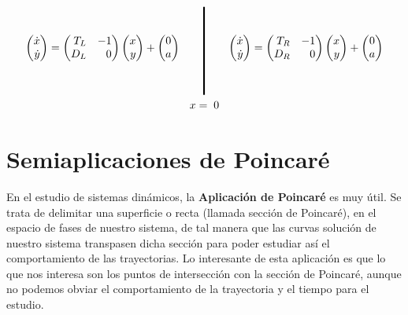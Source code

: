 \documentclass[12pt,a4paper]{report} %
\begin{document}
	\begin{equation}
		\label{eq:lienardrlgr}
		\begin{gathered}
			\begin{pmatrix*}[r]
				\dot{x}\\ \dot{y}
			\end{pmatrix*}= \begin{pmatrix*}[r]
				T_L & -1 \\ D_L & 0
			\end{pmatrix*} \begin{pmatrix*}[r]
				x \\ y
			\end{pmatrix*}+\begin{pmatrix*}[c]
				0 \\ a
			\end{pmatrix*} \qquad 
			\rule[-40pt]{1.5pt}{80pt} \qquad 
			\begin{pmatrix*}[r]
				\dot{x}\\ \dot{y}
			\end{pmatrix*}= \begin{pmatrix*}[r]
				T_R & -1 \\ D_R & 0
			\end{pmatrix*} \begin{pmatrix*}[r]
				x \\ y
			\end{pmatrix*}+\begin{pmatrix*}[c]
				0 \\ a
			\end{pmatrix*} \\ x=\;0
		\end{gathered}
	\end{equation}\smallskip
	
	\newpage
	
	\chapter{Semiaplicaciones de Poincaré}
	\label{sec:4}
	En el estudio de sistemas dinámicos, la \textbf{Aplicación de Poincaré} es muy útil. Se trata de delimitar una superficie o recta (llamada sección de Poincaré), en el espacio de fases de nuestro sistema, de tal manera que las curvas solución de nuestro sistema transpasen dicha sección para poder estudiar así el comportamiento de las trayectorias. Lo interesante de esta aplicación es que lo que nos interesa son los puntos de intersección con la sección de Poincaré, aunque no podemos obviar el comportamiento de la trayectoria y el tiempo para el estudio.\\[0.5cm]
	
\end{document}
